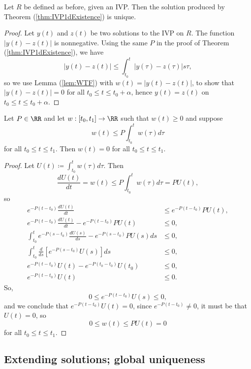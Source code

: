\documentclass{article}
\begin{document}
\begin{theorem}
    Let $R$ be defined as before, given an IVP.
    Then the solution produced by Theorem (\ref{thm:IVP1dExistence}) is unique.
\end{theorem}

\begin{proof}
    Let $y(t)$ and $z(t)$ be two solutions to the IVP on $R$.
    The function $|y(t) - z(t)|$ is nonnegative.
    Using the same $P$ in the proof of Theorem (\ref{thm:IVP1dExistence}), we have
    \[
        |y(t)-z(t)| 
        \leq 
        \int_{t_0}^t|y(\tau)-z(\tau)|s\tau,
    \]
    so we use Lemma (\ref{lem:WTF}) with $w(t) = |y(t)-z(t)|$, to show that $|y(t)-z(t)| = 0$ for all $t_0 \leq t \leq t_0 + \alpha$, hence $y(t) = z(t)$ on $t_0 \leq t \leq t_0 + \alpha$.
\end{proof}

\begin{lemma}
    \label{lem:WTF}
    Let $P \in \RR$ and let $w: [t_0,t_1] \to \RR$ such that $w(t) \geq 0$ and suppose
    \[
        w(t)
        \leq
        P\int_{t_0}^t w(\tau)d\tau
    \]
    for all $t_0 \leq t \leq t_1$.
    Then $w(t) = 0$ for all $t_0 \leq t \leq t_1$.
\end{lemma}

\begin{proof}
    Let $U(t) \coloneq \int_{t_0}^t w(\tau)d\tau$.
    Then
    \[
        \frac{dU(t)}{dt}
        = w(t) 
        \leq P \int_{t_0}^t w(\tau)d\tau
        = PU(t),
    \]
    so
    \begin{align*}
        e^{-P(t-t_0)}
        \frac{dU(t)}{dt}
        &\leq
        e^{-P(t-t_0)}
        PU(t), \\
        e^{-P(t-t_0)}
        \frac{dU(t)}{dt}
        -
        e^{-P(t-t_0)}
        PU(t)
        &\leq 
        0, \\
        \int_{t_0}^t
        e^{-P(s-t_0)}
        \frac{dU(s)}{ds}
        -
        e^{-P(s-t_0)}
        PU(s)
        ds
        &\leq 
        0, \\
        \int_{t_0}^t
        \frac{d}{ds}
        \left[
            e^{-P(s-t_0)}U(s)
        \right]
        ds
        &\leq 
        0, \\
        e^{-P(t-t_0)}U(t)
        - e^{-P(t_0-t_0)}U(t_0)
        &\leq 
        0, \\
        e^{-P(t-t_0)}U(t)
        &\leq 
        0.
    \end{align*}
    So,
    \[
        0 \leq e^{-P(t-t_0)}U(s) \leq 0,
    \]
    and we conclude that $e^{-P(t-t_0)}U(t) = 0$, since $e^{-P(t-t_0)} \neq 0$, it must be that $U(t) = 0$, so
    \[
        0 \leq w(t) \leq PU(t) = 0
    \]
    for all $t_0 \leq t \leq t_1$.
\end{proof}


\subsection{Extending solutions; global uniqueness}
\end{document}
